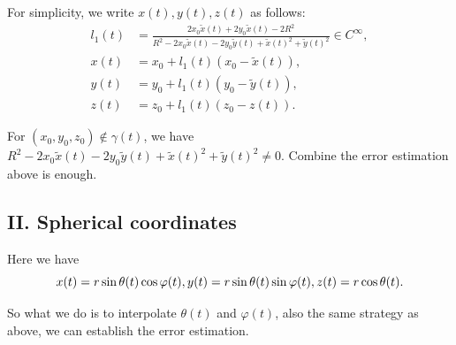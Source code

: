 \documentclass[a4paper]{article}
\begin{document}
For simplicity, we write $x(t), y(t), z(t)$ as follows:
\begin{equation}
    \begin{aligned}
        l_1(t) &= \frac{2x_0 \tilde{x}(t)+2y_0 \tilde{x}(t) - 2 R^2}{R^2 - 2x_0 \tilde{x}(t) - 2y_0 \tilde{y}(t) + \tilde{x}(t)^2 + \tilde{y}(t)^2} \in C^{\infty}, \\
        x(t) &= x_0 + l_1(t) (x_0 - \tilde{x}(t)), \\
        y(t) &= y_0 + l_1(t) (y_0 - \tilde{y}(t)), \\
        z(t) &= z_0 + l_1(t) (z_0 - z(t)).
    \end{aligned}
\end{equation}

For $(x_0, y_0, z_0) \notin \gamma (t)$, we have $R^2 - 2x_0 \tilde{x}(t) - 2y_0 \tilde{y}(t) + \tilde{x}(t)^2 + \tilde{y}(t)^2 \ne 0$. 
Combine the error estimation above is enough. 


\subsection{II. Spherical coordinates}

Here we have 
\begin{equation}
    x(t) = r \sin \theta(t) \cos \varphi(t), \\
    y(t) = r \sin \theta(t) \sin \varphi(t), \\
    z(t) = r \cos \theta(t).
\end{equation}

So what we do is to interpolate $\theta(t)$ and $\varphi(t)$, also the same strategy as above, we can establish the error estimation.
\end{document}
